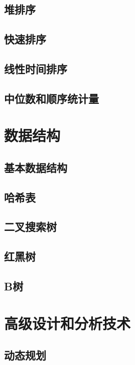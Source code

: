 \documentclass[oneside,10pt,fontset=none]{ctexbook}
\begin{document}
\chapter{堆排序}

\chapter{快速排序}

\chapter{线性时间排序}

\chapter{中位数和顺序统计量}

\part{数据结构}

\chapter{基本数据结构}

\chapter{哈希表}

\chapter{二叉搜索树}

\chapter{红黑树}

\chapter{B树}

\part{高级设计和分析技术}

\chapter{动态规划}
\end{document}
